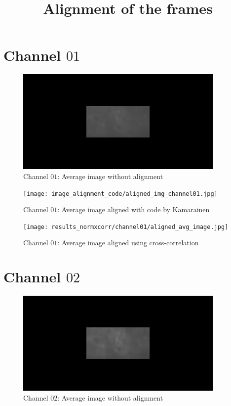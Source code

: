 \documentclass[
	fontsize=12pt,
	paper=a4,
	twoside=false,
	numbers=noenddot,
	plainheadsepline,
	toc=listof,
	toc=bibliography
]{scrartcl}
\title{Alignment of the frames}
\begin{document}
\maketitle

\section{Channel $01$}

\begin{figure} [htb]
	\centering
	\includegraphics[scale = 0.6]{unaligned_avg_image_channel01.jpg}
	\caption{ Channel $01$: Average image without alignment}
\end{figure}

\begin{figure} [htb] \centering
	\texttt{[image: image\_alignment\_code/aligned\_img\_channel01.jpg]}
	\caption{ Channel $01$: Average image aligned with code by Kamarainen \cite{Kamarainen} }
\end{figure}

\begin{figure} [htb] \centering
	\texttt{[image: results\_normxcorr/channel01/aligned\_avg\_image.jpg]}
	\caption{ Channel $01$: Average image aligned using cross-correlation}	
\end{figure}

\FloatBarrier

\newpage
\section{Channel $02$}

\begin{figure} [htb] \centering
	\includegraphics[scale = 0.6]{unaligned_avg_image_channel02.jpg}
	\caption{Channel $02$: Average image without alignment}
\end{figure}
\end{document}
